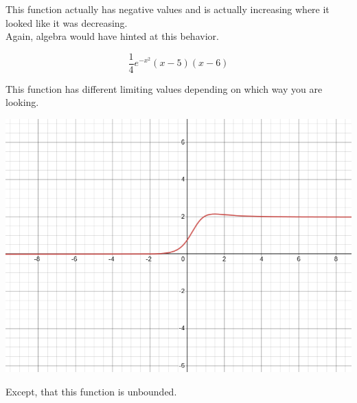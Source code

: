 \documentclass{ximera}
\begin{document}
\begin{example}
This function actually has negative values and is actually increasing where it looked like it was decreasing. \\


Again, algebra would have hinted at this behavior.

\[  \frac{1}{4} e^{-x^2} (x-5)(x-6)     \]


\end{example}










\begin{example}


This function has different limiting values depending on which way you are looking.

\begin{image}
\includegraphics{pics/graph_4A.png}
\end{image}




Except, that this function is unbounded.


\end{example}
\end{document}
